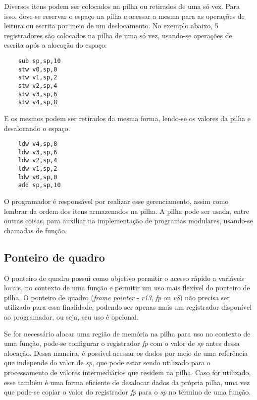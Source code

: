 \documentclass[11pt,a4paper]{report}
\begin{document}
Diversos itens podem ser colocados na pilha ou retirados de uma só vez.
Para isso, deve-se reservar o espaço na pilha e acessar a mesma para
as operações de leitura ou escrita por meio de um deslocamento. No
exemplo abaixo, 5 registradores são colocados na pilha de uma só vez,
usando-se operações de escrita após a alocação do espaço:

\begin{verbatim}
    sub sp,sp,10
    stw v0,sp,0
    stw v1,sp,2
    stw v2,sp,4
    stw v3,sp,6
    stw v4,sp,8
\end{verbatim}

E os mesmos podem ser retirados da mesma forma, lendo-se os valores da
pilha e desalocando o espaço.

\begin{verbatim}
    ldw v4,sp,8
    ldw v3,sp,6
    ldw v2,sp,4
    ldw v1,sp,2
    ldw v0,sp,0
    add sp,sp,10
\end{verbatim}

O programador é responsável por realizar esse gerenciamento, assim como
lembrar da ordem dos itens armazenados na pilha. A pilha pode ser usada,
entre outras coisas, para auxiliar na implementação de programas
modulares, usando-se chamadas de função.

\subsection{Ponteiro de quadro}

O ponteiro de quadro possui como objetivo permitir o acesso rápido a
variáveis locais, no contexto de uma função e permitir um uso mais
flexível do ponteiro de pilha. O ponteiro de quadro (\textit{frame
pointer} - \textit{r13}, \textit{fp} ou \textit{v8}) não precisa ser
utilizado para essa finalidade, podendo ser apenas mais um registrador
disponível ao programador, ou seja, seu uso é opcional.

Se for necessário alocar uma região de memória na pilha para uso no
contexto de uma função, pode-se configurar o registrador \textit{fp}
com o valor de \textit{sp} antes dessa alocação. Dessa maneira, é possível
acessar os dados por meio de uma referência que independe do valor de
\textit{sp}, que pode estar sendo utilizado para o processamento de
valores intermediários que residem na pilha. Caso for utilizado, esse
também é uma forma eficiente de desalocar dados da própria pilha, uma
vez que pode-se copiar o valor do registrador \textit{fp} para o
\textit{sp} no término de uma função.
\end{document}
